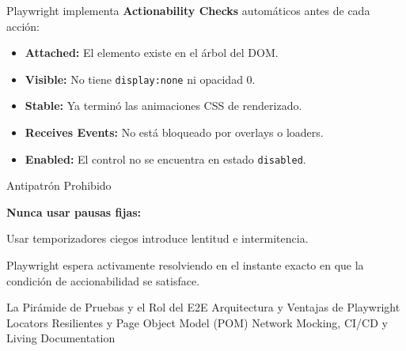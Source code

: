 \documentclass[aspectratio=169]{beamer}
\begin{document}
  {
    {\small
    Playwright implementa \textbf{Actionability Checks} automáticos antes de cada acción:
    \begin{itemize}
      \item \textbf{Attached:} El elemento existe en el árbol del DOM.
      \item \textbf{Visible:} No tiene \texttt{display:none} ni opacidad 0.
      \item \textbf{Stable:} Ya terminó las animaciones CSS de renderizado.
      \item \textbf{Receives Events:} No está bloqueado por overlays o loaders.
      \item \textbf{Enabled:} El control no se encuentra en estado \texttt{disabled}.
    \end{itemize}
    }
  }
  {Antipatrón Prohibido}
  {
    \textbf{Nunca usar pausas fijas:}\par
    Usar temporizadores ciegos introduce lentitud e intermitencia.\par
    Playwright espera activamente resolviendo en el instante exacto en que la condición de accionabilidad se satisface.
  }

  {La Pirámide de Pruebas y el Rol del E2E}
  {Arquitectura y Ventajas de Playwright}
  {Locators Resilientes y Page Object Model (POM)}
  {Network Mocking, CI/CD y Living Documentation}

\end{document}
